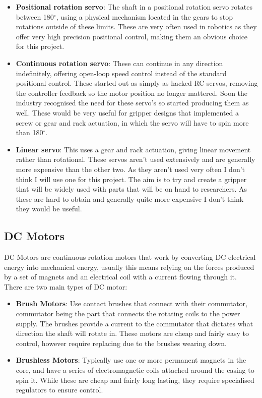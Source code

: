 \documentclass{l4proj}
\begin{document}
\begin{itemize}
	\item 
	\textbf{Positional rotation servo}: The shaft in a positional rotation servo rotates between 180$^{\circ}$, using a physical mechanism located in the gears to stop rotations outside of these limits. These are very often used in robotics as they offer very high precision positional control, making them an obvious choice for this project.
	
	\item
	\textbf{Continuous rotation servo}: These can continue in any direction indefinitely, offering open-loop speed control instead of the standard positional control. These started out as simply as hacked RC servos, removing the controller feedback so the motor position no longer mattered. Soon the industry recognised the need for these servo's so started producing them as well. These would be very useful for gripper designs that implemented a screw or gear and rack actuation, in which the servo will have to spin more than 180$^{\circ}$.
	\item
	\textbf{Linear servo}: This uses a gear and rack actuation, giving linear movement rather than rotational. These servos aren't used extensively and are generally more expensive than the other two. As they aren't used very often I don't think I will use one for this project. The aim is to try and create a gripper that will be widely used with parts that will be on hand to researchers. As these are hard to obtain and generally quite more expensive I don't think they would be useful. 
\end{itemize}

\subsection{DC Motors}
DC Motors are continuous rotation motors that work by converting DC electrical energy into mechanical energy, usually this means relying on the forces produced by a set of magnets and an electrical coil with a current flowing through it. 
\\There are two main types of DC motor: 
\begin{itemize}
	\item \textbf{Brush Motors}: Use contact brushes that connect with their commutator, commutator being the part that connects the rotating coils to the power supply. The brushes provide a current to the commutator that dictates what direction the shaft will rotate in. These motors are cheap and fairly easy to control, however require replacing due to the brushes wearing down.
	\item \textbf{Brushless Motors}: Typically use one or more permanent magnets in the core, and have a series of electromagnetic coils attached around the casing to spin it. While these are cheap and fairly long lasting, they require specialised regulators to ensure control. 
\end{itemize}
\end{document}
